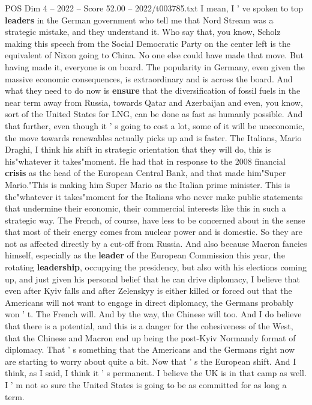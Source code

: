 \begin{textsample}{POS Dim 4 – 2022 – Score 52.00 – 2022/t003785.txt}
I mean, I ' ve spoken to top \textbf{leaders} in the German government who tell me that Nord Stream was a strategic mistake, and they understand it.
Who say that, you know, Scholz making this speech from the Social Democratic Party on the center left is the equivalent of Nixon going to China.
No one else could have made that move.
But having made it, everyone is on board.
The popularity in Germany, even given the massive economic consequences, is extraordinary and is across the board.
And what they need to do now is \textbf{ensure} that the diversification of fossil fuels in the near term away from Russia, towards Qatar and Azerbaijan and even, you know, sort of the United States for LNG, can be done as fast as humanly possible.
And that further, even though it ' s going to cost a lot, some of it will be uneconomic, the move towards renewables actually picks up and is faster.
The Italians, Mario Draghi, I think his shift in strategic orientation that they will do, this is his"whatever it takes"moment.
He had that in response to the 2008 financial \textbf{crisis} as the head of the European Central Bank, and that made him"Super Mario."This is making him Super Mario as the Italian prime minister.
This is the"whatever it takes"moment for the Italians who never make public statements that undermine their economic, their commercial interests like this in such a strategic way.
The French, of course, have less to be concerned about in the sense that most of their energy comes from nuclear power and is domestic.
So they are not as affected directly by a cut-off from Russia.
And also because Macron fancies himself, especially as the \textbf{leader} of the European Commission this year, the rotating \textbf{leadership}, occupying the presidency, but also with his elections coming up, and just given his personal belief that he can drive diplomacy, I believe that even after Kyiv falls and after Zelenskyy is either killed or forced out that the Americans will not want to engage in direct diplomacy, the Germans probably won ' t.
The French will.
And by the way, the Chinese will too.
And I do believe that there is a potential, and this is a danger for the cohesiveness of the West, that the Chinese and Macron end up being the post-Kyiv Normandy format of diplomacy.
That ' s something that the Americans and the Germans right now are starting to worry about quite a bit.
Now that ' s the European shift.
And I think, as I said, I think it ' s permanent.
I believe the UK is in that camp as well.
I ' m not so sure the United States is going to be as committed for as long a term.

\end{textsample}
